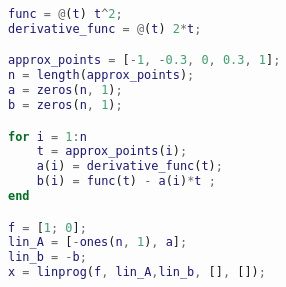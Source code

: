 \begin{lstlisting}[language=Matlab]
func = @(t) t^2;
derivative_func = @(t) 2*t;

approx_points = [-1, -0.3, 0, 0.3, 1];
n = length(approx_points);
a = zeros(n, 1); 
b = zeros(n, 1);

for i = 1:n
    t = approx_points(i);
    a(i) = derivative_func(t); 
    b(i) = func(t) - a(i)*t ;
end

f = [1; 0];
lin_A = [-ones(n, 1), a];
lin_b = -b;
x = linprog(f, lin_A,lin_b, [], []);

\end{lstlisting}